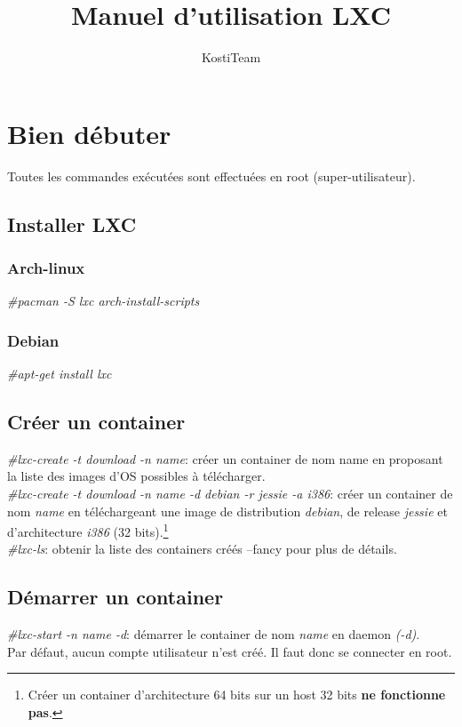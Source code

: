 \documentclass[twoside]{article}
\author{KostiTeam}
\title{Manuel d'utilisation LXC}
\begin{document}
\maketitle
\newpage
\tableofcontents
\newpage

\section{Bien d\'ebuter}
Toutes les commandes ex\'ecut\'ees sont effectu\'ees en root (super-utilisateur).

\subsection{Installer LXC}
\subsubsection{Arch-linux}
\emph{\#pacman -S lxc arch-install-scripts}
\subsubsection{Debian}
\emph{\#apt-get install lxc}

\subsection{Cr\'eer un container}
\emph{\#lxc-create -t download -n name}: cr\'eer un container de nom name en proposant la liste des images d'OS possibles \`a t\'el\'echarger.\\ 

\emph{\#lxc-create -t download -n name -d debian -r jessie -a i386}: cr\'eer un container de nom \emph{name} en t\'el\'echargeant une image de distribution \emph{debian}, de release \emph{jessie} et d'architecture \emph{i386} (32 bits).\footnote{Cr\'eer un container d'architecture 64 bits sur un host 32 bits \textbf{ne fonctionne pas}.}\\

\emph{\#lxc-ls}: obtenir la liste des containers cr\'e\'es --fancy pour plus de d\'etails.\\
  
\subsection{D\'emarrer un container}
\emph{\#lxc-start -n name  -d}: d\'emarrer le container de nom \emph{name} en daemon \emph{(-d)}.\\
Par d\'efaut, aucun compte utilisateur n'est cr\'e\'e. Il faut donc se connecter en root.\\ 
\end{document}
